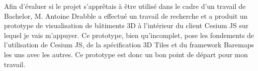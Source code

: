 Afin d'évaluer si le projet s'apprêtais à être utilisé dans le cadre d'un travail de Bachelor, M. Antoine Drabble a effectué un travail de recherche et a produit un prototype de visualisation de bâtiments 3D à l'intérieur du client Cesium JS sur lequel je vais m'appuyer. Ce prototype, bien qu'incomplet, pose les fondements de l'utilisation de Cesium JS, de la spécification 3D Tiles et du framework Baremaps les uns avec les autres. Ce prototype est donc un bon point de départ pour mon travail.





